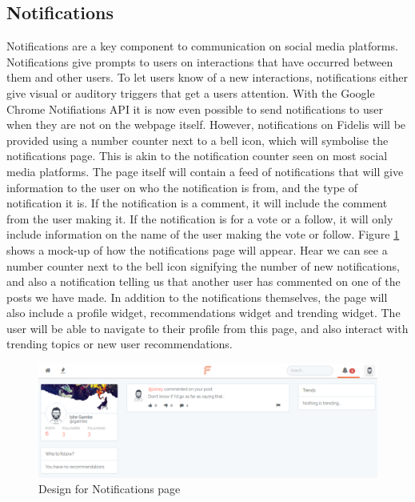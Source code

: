 \subsection{Notifications}
Notifications are a key component to communication on social media platforms. Notifications give prompts to users on interactions that have occurred between them and other users. To let users know of a new interactions, notifications either give visual or auditory triggers that get a users attention. With the Google Chrome Notifiations API \cite{ChromeAPI:Notifications} it is now even possible to send notifications to user when they are not on the webpage itself. However, notifications on Fidelis will be provided using a number counter next to a bell icon, which will symbolise the notifications page. This is akin to the notification counter seen on most social media platforms. The page itself will contain a feed of notifications that will give information to the user on who the notification is from, and the type of notification it is. If the notification is a comment, it will include the comment from the user making it. If the notification is for a vote or a follow, it will only include information on the name of the user making the vote or follow. Figure \ref{fig:notifications-page} shows a mock-up of how the notifications page will appear. Hear we can see a number counter next to the bell icon signifying the number of new notifications, and also a notification telling us that another user has commented on one of the posts we have made. In addition to the notifications themselves, the page will also include a profile widget, recommendations widget and trending widget. The user will be able to navigate to their profile from this page, and also interact with trending topics or new user recommendations.

\begin{figure}[H]
\centering
\includegraphics[width=1\linewidth]{Images/Design/notifications-page}
\caption{Design for Notifications page}
\label{fig:notifications-page}
\end{figure}


